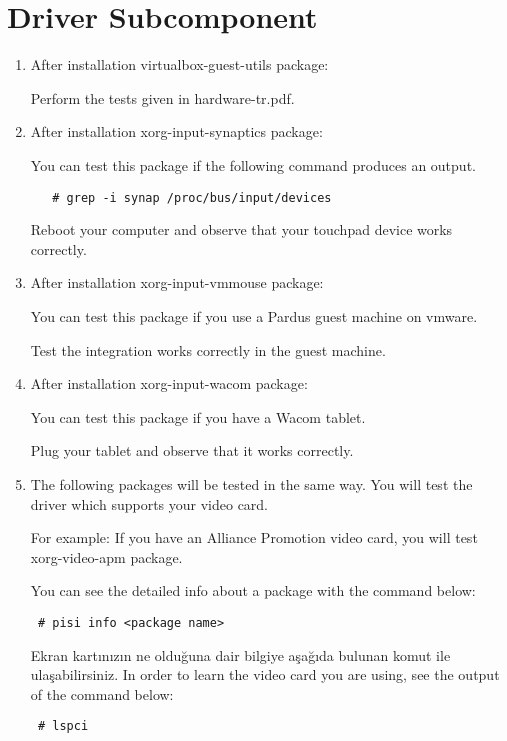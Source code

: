 \documentclass[a4paper,10pt]{article}
\begin{document}
\section{Driver Subcomponent}
\begin{enumerate}
  \item After installation virtualbox-guest-utils package:

Perform the tests given in hardware-tr.pdf.

  \item After installation xorg-input-synaptics package:

You can test this package if the following command produces an output.
  \begin{verbatim}
   # grep -i synap /proc/bus/input/devices
  \end{verbatim}

Reboot your computer and observe that your touchpad device works correctly.

\item After installation  xorg-input-vmmouse package:

You can test this package if you use a Pardus guest machine on vmware.

Test the integration works correctly in the guest machine.

\item After installation  xorg-input-wacom package:

You can test this package if you have a Wacom tablet.

Plug your tablet and observe that it works correctly.

\item The following packages will be tested in the same way. You will test the driver which supports your video card.

For example: If you have an Alliance Promotion video card, you will test xorg-video-apm package.

You can see the detailed info about a package with the command below:
\begin{verbatim}
 # pisi info <package name>
\end{verbatim}

Ekran kartınızın ne olduğuna dair bilgiye aşağıda bulunan komut ile ulaşabilirsiniz.
In order to learn the video card you are using, see the output of the command below:
\begin{verbatim}
 # lspci
\end{verbatim}


\end{enumerate}
\end{document}
